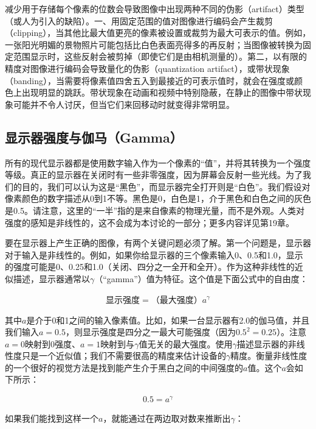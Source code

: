\documentclass[lang=cn,12pt]{elegantbook}
\begin{document}
减少用于存储每个像素的位数会导致图像中出现两种不同的伪影（artifact）类型（或人为引入的缺陷）。一、用固定范围的值对图像进行编码会产生裁剪（clipping），当其他比最大值更亮的像素被设置或裁剪为最大可表示的值。例如，一张阳光明媚的景物照片可能包括比白色表面亮得多的再反射；当图像被转换为固定范围显示时，这些反射会被剪掉（即使它们是由相机测量的）。第二，以有限的精度对图像进行编码会导致量化的伪影（quantization artifact），或带状现象（banding），当需要将像素值四舍五入到最接近的可表示值时，就会在强度或颜色上出现明显的跳跃。带状现象在动画和视频中特别隐蔽，在静止的图像中带状现象可能并不令人讨厌，但当它们来回移动时就变得非常明显。

\subsection{显示器强度与伽马（Gamma）}

所有的现代显示器都是使用数字输入作为一个像素的“值”，并将其转换为一个强度等级。真正的显示器在关闭时有一些非零强度，因为屏幕会反射一些光线。为了我们的目的，我们可以认为这是“黑色”，而显示器完全打开则是“白色”。我们假设对像素颜色的数字描述从0到1不等。黑色是0，白色是1，介于黑色和白色之间的灰色是0.5。请注意，这里的“一半”指的是来自像素的物理光量，而不是外观。人类对强度的感知是非线性的，这不会成为本讨论的一部分；更多内容详见第19章。

要在显示器上产生正确的图像，有两个关键问题必须了解。第一个问题是，显示器对于输入是非线性的。例如，如果你给显示器的三个像素输入0、0.5和1.0，显示的强度可能是0、0.25和1.0（关闭、四分之一全开和全开）。作为这种非线性的近似描述，显示器通常以$\gamma $（“gamma”）值为特征。这个值是下面公式中的自由度：

\begin{align}
  \mbox{显示强度}=\mbox{（最大强度）}a^\gamma
\end{align}

其中$a$是介于0和1之间的输入像素值。比如，如果一台显示器有2.0的伽马值，并且我们输入$a=0.5$，则显示强度是四分之一最大可能强度（因为$0.5^2=0.25$）。注意$a=0$映射到0强度、$a=1$映射到与$\gamma$值无关的最大强度。使用$\gamma$描述显示器的非线性度只是一个近似值；我们不需要很高的精度来估计设备的$\gamma$精度。衡量非线性度的一个很好的视觉方法是找到能产生介于黑白之间的中间强度的$a$值。这个$a$会如下所示：

\[
  \begin{aligned}
    0.5 = a^\gamma
  \end{aligned}
\]

如果我们能找到这样一个$a$，就能通过在两边取对数来推断出$\gamma$：
\end{document}
